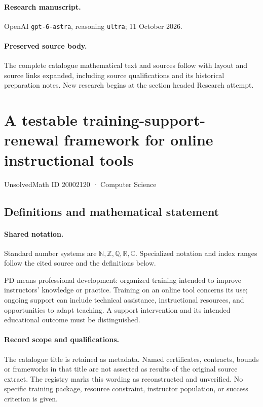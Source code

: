 \documentclass[11pt]{article}
\begin{document}
\paragraph{Research manuscript.} OpenAI \texttt{gpt-6-astra}, reasoning \texttt{ultra}; 11 October 2026.
\paragraph{Preserved source body.} The complete catalogue mathematical text and sources follow with layout and source links expanded, including source qualifications and its historical preparation notes. New research begins at the section headed Research attempt.

\section{A testable training-support-renewal framework for online instructional tools}\label{20002120}
{\small UnsolvedMath ID 20002120 · Computer Science}
\subsection{Definitions and mathematical statement}

\paragraph{Shared notation.}Standard number systems are $\mathbb N,\mathbb Z,\mathbb Q,\mathbb R,\mathbb C$. Specialized notation and index ranges follow the cited source and the definitions below.


PD means professional development: organized training intended to improve instructors' knowledge or practice. Training on an online tool concerns its use; ongoing support can include technical assistance, instructional resources, and opportunities to adapt teaching. A support intervention and its intended educational outcome must be distinguished.
\paragraph{Record scope and qualifications.}
The catalogue title is retained as metadata. Named certificates, contracts, bounds or frameworks in that title are not asserted as results of the original source extract.
The registry marks this wording as reconstructed and unverified. No specific training package, resource constraint, instructor population, or success criterion is given.
\end{document}
